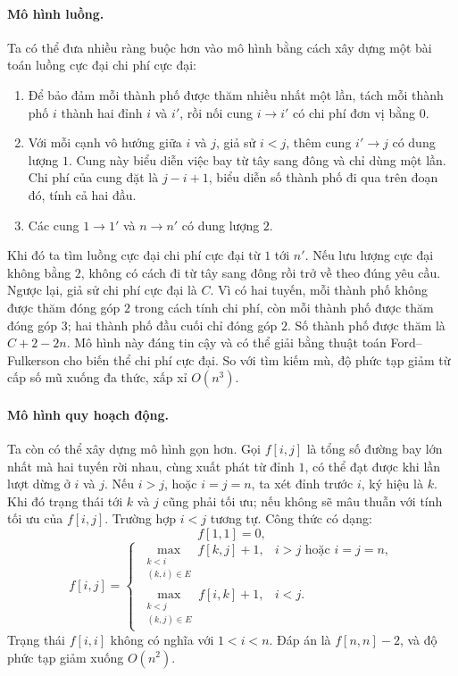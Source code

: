 \documentclass[11pt]{article}
\begin{document}
\paragraph{Mô hình luồng.}
Ta có thể đưa nhiều ràng buộc hơn vào mô hình bằng cách xây dựng một bài toán
luồng cực đại chi phí cực đại:
\begin{enumerate}
  \item Để bảo đảm mỗi thành phố được thăm nhiều nhất một lần, tách mỗi thành
  phố \(i\) thành hai đỉnh \(i\) và \(i'\), rồi nối cung \(i\to i'\) có chi
  phí đơn vị bằng \(0\).
  \item Với mỗi cạnh vô hướng giữa \(i\) và \(j\), giả sử \(i<j\), thêm cung
  \(i'\to j\) có dung lượng \(1\). Cung này biểu diễn việc bay từ tây sang
  đông và chỉ dùng một lần. Chi phí của cung đặt là \(j-i+1\), biểu diễn số
  thành phố đi qua trên đoạn đó, tính cả hai đầu.
  \item Các cung \(1\to 1'\) và \(n\to n'\) có dung lượng \(2\).
\end{enumerate}

Khi đó ta tìm luồng cực đại chi phí cực đại từ \(1\) tới \(n'\). Nếu lưu lượng
cực đại không bằng \(2\), không có cách đi từ tây sang đông rồi trở về theo
đúng yêu cầu. Ngược lại, giả sử chi phí cực đại là \(C\). Vì có hai tuyến, mỗi
thành phố không được thăm đóng góp \(2\) trong cách tính chi phí, còn mỗi
thành phố được thăm đóng góp \(3\); hai thành phố đầu cuối chỉ đóng góp \(2\).
Số thành phố được thăm là \(C+2-2n\). Mô hình này đáng tin cậy và có thể giải
bằng thuật toán Ford--Fulkerson cho biến thể chi phí cực đại. So với tìm kiếm
mù, độ phức tạp giảm từ cấp số mũ xuống đa thức, xấp xỉ \(O(n^3)\).

\paragraph{Mô hình quy hoạch động.}
Ta còn có thể xây dựng mô hình gọn hơn. Gọi \(f[i,j]\) là tổng số đường bay
lớn nhất mà hai tuyến rời nhau, cùng xuất phát từ đỉnh \(1\), có thể đạt được
khi lần lượt dừng ở \(i\) và \(j\). Nếu \(i>j\), hoặc \(i=j=n\), ta xét đỉnh
trước \(i\), ký hiệu là \(k\). Khi đó trạng thái tới \(k\) và \(j\) cũng phải
tối ưu; nếu không sẽ mâu thuẫn với tính tối ưu của \(f[i,j]\). Trường hợp
\(i<j\) tương tự. Công thức có dạng:
\[
f[1,1]=0,
\]
\[
f[i,j]=
\begin{cases}
\displaystyle \max_{\substack{k<i\\(k,i)\in E}} f[k,j]+1,
  & i>j \text{ hoặc } i=j=n,\\[1.2em]
\displaystyle \max_{\substack{k<j\\(k,j)\in E}} f[i,k]+1,
  & i<j.
\end{cases}
\]
Trạng thái \(f[i,i]\) không có nghĩa với \(1<i<n\). Đáp án là
\(f[n,n]-2\), và độ phức tạp giảm xuống \(O(n^2)\).
\end{document}
